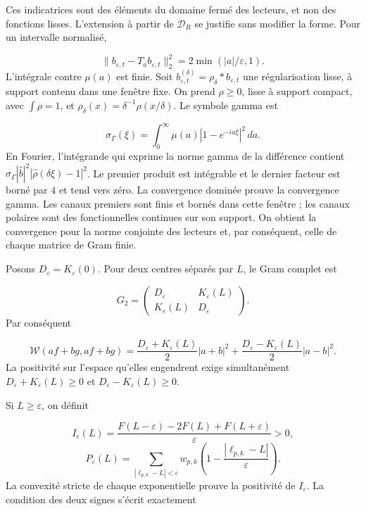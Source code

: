 Ces indicatrices sont des éléments du domaine fermé des lecteurs, et non des fonctions lisses. L’extension à partir de \(\mathcal D_R\) se justifie sans modifier la forme. Pour un intervalle normalisé,

\[
\|b_{\varepsilon,t}-T_ab_{\varepsilon,t}\|_2^2
=2\min(|a|/\varepsilon,1).
\]
L’intégrale contre \(\mu(a)\) est finie. Soit \(b_{\varepsilon,t}^{(\delta)}=\rho_\delta*b_{\varepsilon,t}\) une régularisation lisse, à support contenu dans une fenêtre fixe. On prend \(\rho\geq0\), lisse à support compact, avec \(\int\rho=1\), et \(\rho_\delta(x)=\delta^{-1}\rho(x/\delta)\). Le symbole gamma est

\[
\sigma_\Gamma(\xi)=\int_0^\infty
\mu(a)|1-e^{-ia\xi}|^2\,da.
\]
En Fourier, l'intégrande qui exprime la norme gamma de la différence contient \(\sigma_\Gamma|\widehat b|^2 |\widehat\rho(\delta\xi)-1|^2\). Le premier produit est intégrable et le dernier facteur est borné par \(4\) et tend vers zéro. La convergence dominée prouve la convergence gamma. Les canaux premiers sont finis et bornés dans cette fenêtre ; les canaux polaires sont des fonctionnelles continues sur son support. On obtient la convergence pour la norme conjointe des lecteurs et, par conséquent, celle de chaque matrice de Gram finie.

Posons \(D_\varepsilon=K_\varepsilon(0)\). Pour deux centres séparés par \(L\), le Gram complet est

\[
G_2=\begin{pmatrix}D_\varepsilon&K_\varepsilon(L)\\
K_\varepsilon(L)&D_\varepsilon\end{pmatrix}.
\]
Par conséquent

\[
\mathscr W(af+bg,af+bg)=
\frac{D_\varepsilon+K_\varepsilon(L)}2|a+b|^2
+\frac{D_\varepsilon-K_\varepsilon(L)}2|a-b|^2.
\]
La positivité sur l’espace qu’elles engendrent exige simultanément \(D_\varepsilon+K_\varepsilon(L)\geq0\) et \(D_\varepsilon-K_\varepsilon(L)\geq0\).

Si \(L\geq\varepsilon\), on définit

\[
I_\varepsilon(L)=
\frac{F(L-\varepsilon)-2F(L)+F(L+\varepsilon)}{\varepsilon}>0,
\]
\[
P_\varepsilon(L)=
\sum_{|\ell_{p,k}-L|<\varepsilon}w_{p,k}
\left(1-\frac{|\ell_{p,k}-L|}{\varepsilon}\right).
\]
La convexité stricte de chaque exponentielle prouve la positivité de \(I_\varepsilon\). La condition des deux signes s’écrit exactement

